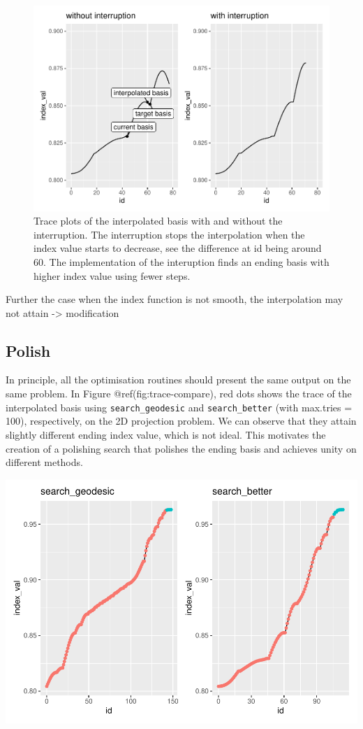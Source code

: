 \documentclass[12pt]{article}
\begin{document}
\begin{figure}
\centering
\includegraphics{paper_files/figure-latex/interruption-1.pdf}
\caption{\label{interruption} Trace plots of the interpolated basis with
and without the interruption. The interruption stops the interpolation
when the index value starts to decrease, see the difference at id being
around 60. The implementation of the interuption finds an ending basis
with higher index value using fewer steps.}
\end{figure}

Further the case when the index function is not smooth, the
interpolation may not attain -\textgreater{} modification

\hypertarget{polish}{%
\subsection{Polish}\label{polish}}

In principle, all the optimisation routines should present the same
output on the same problem. In Figure @ref(fig:trace-compare), red dots
shows the trace of the interpolated basis using
\texttt{search\_geodesic} and \texttt{search\_better} (with max.tries =
100), respectively, on the 2D projection problem. We can observe that
they attain slightly different ending index value, which is not ideal.
This motivates the creation of a polishing search that polishes the
ending basis and achieves unity on different methods.

\includegraphics{paper_files/figure-latex/unnamed-chunk-11-1.pdf}
\end{document}
